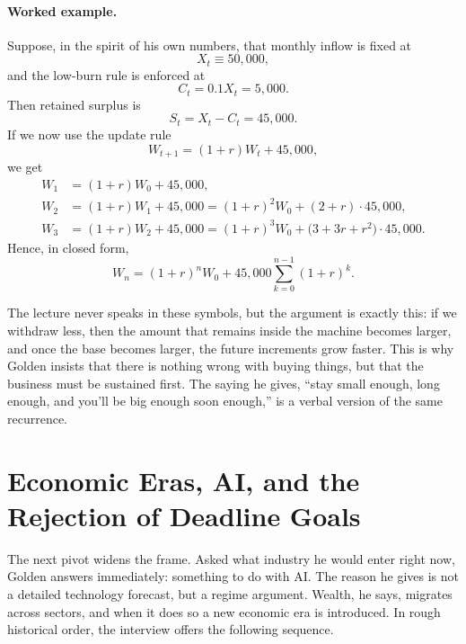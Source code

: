 \paragraph{Worked example.}
Suppose, in the spirit of his own numbers, that monthly inflow is fixed at
\[
X_t \equiv 50{,}000,
\]
and the low-burn rule is enforced at
\[
C_t = 0.1X_t = 5{,}000.
\]
Then retained surplus is
\[
S_t = X_t-C_t = 45{,}000.
\]
If we now use the update rule
\[
W_{t+1}=(1+r)W_t+45{,}000,
\]
we get
\begin{align}
W_1 &= (1+r)W_0+45{,}000,\\
W_2 &= (1+r)W_1+45{,}000
     = (1+r)^2W_0+(2+r)\cdot 45{,}000,\\
W_3 &= (1+r)W_2+45{,}000
     = (1+r)^3W_0+\bigl(3+3r+r^2\bigr)\cdot 45{,}000.
\end{align}
Hence, in closed form,
\begin{equation}
W_n=(1+r)^nW_0+45{,}000\sum_{k=0}^{n-1}(1+r)^k.
\end{equation}

The lecture never speaks in these symbols, but the argument is exactly this: if we withdraw less, then the amount that remains inside the machine becomes larger, and once the base becomes larger, the future increments grow faster. This is why Golden insists that there is nothing wrong with buying things, but that the business must be sustained first. The saying he gives, ``stay small enough, long enough, and you'll be big enough soon enough,'' is a verbal version of the same recurrence.

\section{Economic Eras, AI, and the Rejection of Deadline Goals}

The next pivot widens the frame. Asked what industry he would enter right now, Golden answers immediately: something to do with AI. The reason he gives is not a detailed technology forecast, but a regime argument. Wealth, he says, migrates across sectors, and when it does so a new economic era is introduced. In rough historical order, the interview offers the following sequence.

